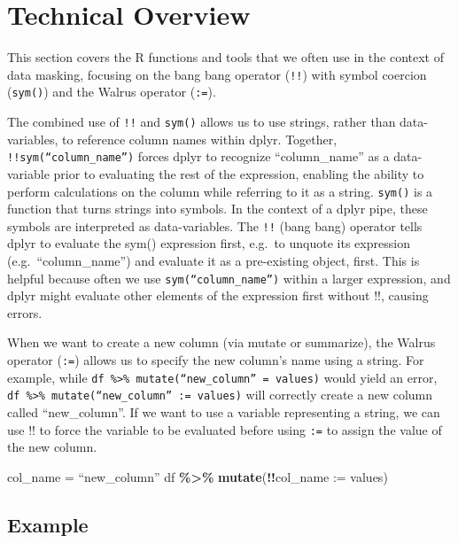 \documentclass[
]{book}
\newenvironment{Shaded}{\begin{snugshade}}{\end{snugshade}}
\newcommand{\AttributeTok}[1]{\textcolor[rgb]{0.13,0.29,0.53}{#1}}
\newcommand{\FunctionTok}[1]{\textcolor[rgb]{0.13,0.29,0.53}{\textbf{#1}}}
\newcommand{\NormalTok}[1]{#1}
\newcommand{\OtherTok}[1]{\textcolor[rgb]{0.56,0.35,0.01}{#1}}
\newcommand{\SpecialCharTok}[1]{\textcolor[rgb]{0.81,0.36,0.00}{\textbf{#1}}}
\begin{document}
\section{Technical Overview}\label{technical-overview}

This section covers the R functions and tools that we often use in the context of data masking, focusing on the bang bang operator (\texttt{!!}) with symbol coercion (\texttt{sym()}) and the Walrus operator (\texttt{:=}).

The combined use of \texttt{!!} and \texttt{sym()} allows us to use strings, rather than data-variables, to reference column names within dplyr. Together, \texttt{!!sym(“column\_name”)} forces dplyr to recognize ``column\_name'' as a data-variable prior to evaluating the rest of the expression, enabling the ability to perform calculations on the column while referring to it as a string.
\texttt{sym()} is a function that turns strings into symbols. In the context of a dplyr pipe, these symbols are interpreted as data-variables.
The \texttt{!!} (bang bang) operator tells dplyr to evaluate the sym() expression first, e.g.~to unquote its expression (e.g.~``column\_name'') and evaluate it as a pre-existing object, first. This is helpful because often we use \texttt{sym(“column\_name”)} within a larger expression, and dplyr might evaluate other elements of the expression first without !!, causing errors.

When we want to create a new column (via mutate or summarize), the Walrus operator (\texttt{:=}) allows us to specify the new column's name using a string. For example, while \texttt{df\ \%\textgreater{}\%\ mutate(“new\_column”\ =\ values)} would yield an error, \texttt{df\ \%\textgreater{}\%\ mutate(“new\_column”\ :=\ values)} will correctly create a new column called ``new\_column''.
If we want to use a variable representing a string, we can use !! to force the variable to be evaluated before using \texttt{:=} to assign the value of the new column.

\begin{Shaded}
\begin{Highlighting}[]
\NormalTok{col\_name }\OtherTok{=}\NormalTok{ “new\_column”}
\NormalTok{df }\SpecialCharTok{\%\textgreater{}\%} \FunctionTok{mutate}\NormalTok{(}\SpecialCharTok{!!}\AttributeTok{col\_name :=}\NormalTok{ values)}
\end{Highlighting}
\end{Shaded}

\subsection{Example}\label{example}
\end{document}
